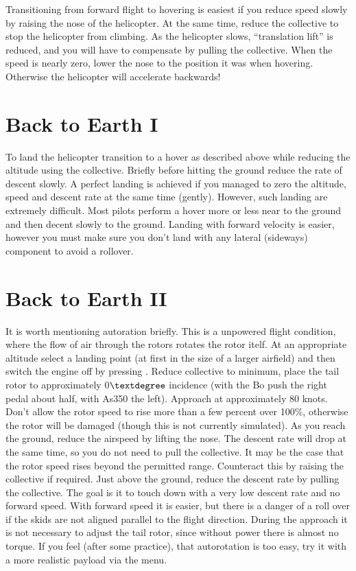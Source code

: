 Transitioning from forward flight to hovering is easiest if you reduce speed 
slowly by raising the nose of the helicopter. At the same time, reduce the 
collective to stop the helicopter from climbing. As the helicopter slows, 
``translation lift'' is reduced, and you will have to compensate by pulling 
the collective. When the speed is nearly zero, lower the nose to the position 
it was when hovering. Otherwise the helicopter will accelerate backwards! 

\section{Back to Earth I}
 
To land the helicopter transition to a hover as described above while reducing 
the altitude using the collective. Briefly before hitting the ground reduce 
the rate of descent slowly. A perfect landing is achieved if you managed to 
zero the altitude, speed and descent rate at the same time (gently). 
However, such landing are extremely difficult. Most pilots perform a hover 
more or less near to the ground and then decent slowly to the ground. Landing 
with forward velocity is easier, however you must make sure you don't land 
with any lateral (sideways) component to avoid a rollover. 


\section{Back to Earth II}

It is worth mentioning autoration briefly. This is a unpowered flight condition, 
where the flow of air through the rotors rotates the rotor itelf. At an 
appropriate altitude select a landing point (at first in the size of a larger 
airfield) and then switch the engine off by pressing \key{\{}. Reduce 
collective to minimum, place the tail rotor to approximately 0$\textdegree$ 
incidence (with the Bo push the right pedal about half, with As350 the left). 
Approach at approximately 80 knots. Don't allow the rotor speed to rise more 
than a few percent over 100\%, otherwise the rotor will be damaged (though 
this is not currently simulated). As you reach the ground, reduce the airspeed 
by lifting the nose. The descent rate will drop at the same time, so you do 
not need to pull the collective. It may be the case that the rotor speed 
rises beyond the permitted range. Counteract this by raising the collective 
if required. Just above the ground, reduce the descent rate by pulling the 
collective. The goal is it to touch down with a very low descent rate and no 
forward speed. With forward speed it is easier, but there is a danger of a 
roll over if the skids are not aligned parallel to the flight direction. 
During the approach it is not necessary to adjust the tail rotor, since 
without power there is almost no torque. If you feel (after some practice), 
that autorotation is too easy, try it with a more realistic payload via 
the  menu. 

\fi












